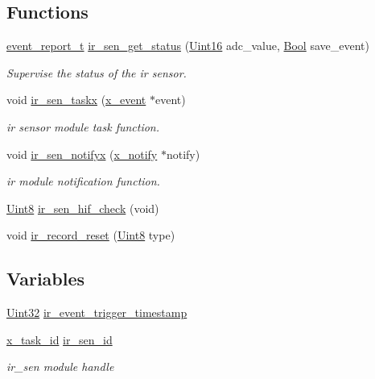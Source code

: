 \subsection*{Functions}
\begin{DoxyCompactItemize}
\item 
\hyperlink{a00021_d6/d66/a00441}{event\+\_\+report\+\_\+t} \hyperlink{a00017_a5bba51487aeccd791ff56017124da833}{ir\+\_\+sen\+\_\+get\+\_\+status} (\hyperlink{a00072_a59a9f6be4562c327cbfb4f7e8e18f08b}{Uint16} adc\+\_\+value, \hyperlink{a00072_a253b248072cfc8bd812c69acd0046eed}{Bool} save\+\_\+event)
\begin{DoxyCompactList}\small\item\em Supervise the status of the ir sensor. \end{DoxyCompactList}\item 
void \hyperlink{a00017_a24529100c87dfc257e9b56f7f0bcfa78}{ir\+\_\+sen\+\_\+taskx} (\hyperlink{a00036_de/d37/a00849}{x\+\_\+event} $\ast$event)
\begin{DoxyCompactList}\small\item\em ir sensor module task function. \end{DoxyCompactList}\item 
void \hyperlink{a00017_a36c6c2cdf9aa5844371e742330789dad}{ir\+\_\+sen\+\_\+notifyx} (\hyperlink{a00036_df/d4c/a00851}{x\+\_\+notify} $\ast$notify)
\begin{DoxyCompactList}\small\item\em ir module notification function. \end{DoxyCompactList}\item 
\hyperlink{a00072_af84840501dec18061d18a68c162a8fa2}{Uint8} \hyperlink{a00017_a86870a0e00601a92277e689447739ce9}{ir\+\_\+sen\+\_\+hif\+\_\+check} (void)
\item 
void \hyperlink{a00017_a1c9872e93491d95a24ab0bc723d39a74}{ir\+\_\+record\+\_\+reset} (\hyperlink{a00072_af84840501dec18061d18a68c162a8fa2}{Uint8} type)
\end{DoxyCompactItemize}
\subsection*{Variables}
\begin{DoxyCompactItemize}
\item 
\hyperlink{a00072_aba99025e657f892beb7ff31cecf64653}{Uint32} \hyperlink{a00017_a6951f534a479b17c02d7da3ad6489634}{ir\+\_\+event\+\_\+trigger\+\_\+timestamp}
\item 
\hyperlink{a00036_ad5c3c5fbfd3e4aadf22830395484a71d}{x\+\_\+task\+\_\+id} \hyperlink{a00017_a624782f67b3870f0dde83528770ef5fc}{ir\+\_\+sen\+\_\+id}
\begin{DoxyCompactList}\small\item\em ir\+\_\+sen module handle \end{DoxyCompactList}\end{DoxyCompactItemize}


